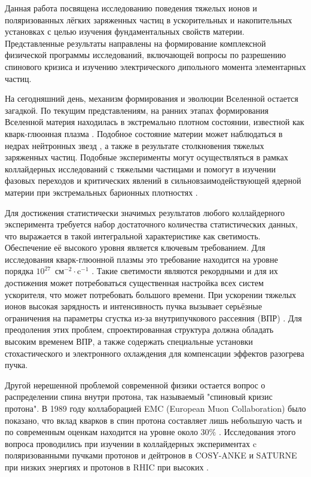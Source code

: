 \par {\actuality} Данная работа посвящена исследованию поведения тяжелых ионов и поляризованных лёгких заряженных частиц в ускорительных и накопительных установках с целью изучения фундаментальных свойств материи. Представленные результаты направлены на формирование комплексной физической программы исследований, включающей вопросы по разрешению спинового кризиса и изучению электрического дипольного момента элементарных частиц.

\par	На сегодняшний день, механизм формирования и эволюции Вселенной остается загадкой. По текущим представлениям, на ранних этапах формирования Вселенной материя находилась в экстремально плотном состоянии, известной как кварк-глюонная плазма \autocite{phase_transition_universe}. Подобное состояние материи может наблюдаться в недрах нейтронных звезд \autocite{neutron_stars}, а также в результате столкновения тяжелых заряженных частиц. Подобные эксперименты могут осуществляться в рамках коллайдерных исследований с тяжелыми частицами и помогут в изучении фазовых переходов и критических явлений в сильновзаимодействующей ядерной материи при экстремальных барионных плотностях \autocite{quark_gluon}.

\par	Для достижения статистически значимых результатов любого коллайдерного эксперимента требуется набор достаточного количества статистических данных, что выражается в такой интегральной характеристике как светимость. Обеспечение её высокого уровня является ключевым требованием. Для исследования кварк-глюонной плазмы это требование находится на уровне порядка $10^{27}$~$\text{см}^{-2}\cdot\text{c}^{-1}$ \autocite{RHIC_luminosity_heavy}. Такие светимости являются рекордными и для их достижения может потребоваться существенная настройка всех систем ускорителя, что может потребовать большого времени. При ускорении тяжелых ионов высокая зарядность и интенсивность пучка вызывает серьёзные ограничения на параметры сгустка из-за внутрипучкового рассеяния (ВПР) \autocite{2016_IBS}. Для преодоления этих проблем, спроектированная структура должна обладать высоким временем ВПР, а также содержать специальные установки стохастического и электронного охлаждения для компенсации эффектов разогрева пучка.

\par	Другой нерешенной проблемой современной физики остается вопрос о распределении спина внутри протона, так называемый "спиновый кризис протона". В 1989 году коллаборацией EMC (European Muon Collaboration) \autocite{spin_crisis_1989} было показано, что вклад кварков в спин протона составляет лишь небольшую часть и по современным оценкам находится на уровне около 30$\%$ \autocite{quarks_overview_2022}. Исследования этого вопроса проводились при изучении в коллайдерных экспериментах c поляризованными пучками протонов и дейтронов в COSY-ANKE \autocite{COSY_ANKE} и SATURNE \autocite{SATURNE} при низких энергиях и протонов в RHIC при высоких \autocite{RHIC_2014}. 

